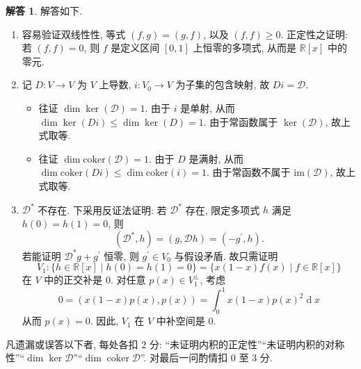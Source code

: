 \documentclass{MainStyle}
\theoremstyle{definition}
\newtheorem{solution}{解答}
\begin{document}
\begin{solution}
    解答如下.
    \begin{enumerate}
        \item 容易验证双线性性, 等式 $(f,g)=(g,f)$, 以及 $(f,f)\geq 0$. 正定性之证明: 若 $(f,f)=0$, 则 $f$ 是定义区间 $[0,1]$ 上恒零的多项式, 从而是 $\mathbb R[x]$ 中的零元.
        \item 记 $D:V\to V$ 为 $V$ 上导数, $i:V_0\to V$ 为子集的包含映射, 故 $Di=\mathscr D$.
              \begin{itemize}
                  \item 往证 $\dim \ker (\mathscr D)=1$. 由于 $i$ 是单射, 从而 $\dim \ker (Di)\leq \dim \ker (D)=1$. 由于常函数属于 $\ker (\mathscr D)$, 故上式取等.
                  \item 往证 $\dim \mathrm{coker} (\mathscr D)=1$. 由于 $D$ 是满射, 从而 $\dim \mathrm{coker}  (Di)\leq \dim \mathrm{coker}  (i)=1$. 由于常函数不属于 $\mathrm{im} (\mathscr D)$, 故上式取等.
              \end{itemize}
        \item $\mathscr D^\ast$ 不存在. 下采用反证法证明: 若 $\mathscr D^\ast$ 存在, 限定多项式 $h$ 满足 $h(0)=h(1)=0$, 则
              \begin{equation*}
                  (\mathscr D^\ast, h)=(g,\mathscr Dh)=(-g^\prime ,h).
              \end{equation*}
              若能证明 $\mathscr D^\ast g +g^\prime$ 恒零, 则 $g^\prime \in V_0$ 与假设矛盾. 故只需证明
              \begin{equation*}
                  V_1:\{h\in \mathbb R[x]\mid h(0)=h(1)=0\}=\{x(1-x)f(x)\mid f\in \mathbb R[x]\}
              \end{equation*}
              在 $V$ 中的正交补是 $0$. 对任意 $p(x)\in V_1^\perp$, 考虑
              \begin{equation*}
                  0=(x(1-x)p(x),p(x))=\int_0^1 x(1-x) p(x)^2\operatorname{d}x
              \end{equation*}
              从而 $p(x)=0$. 因此, $V_1$ 在 $V$ 中补空间是 $0$.
    \end{enumerate}
\end{solution}

\begin{evaluation}
    凡遗漏或误答以下者, 每处各扣 $2$ 分: ``未证明内积的正定性''``未证明内积的对称性''``$\dim \ker\mathscr D$''``$\dim \operatorname{coker}\mathscr D$''. 对最后一问酌情扣 $0$ 至 $3$ 分.
\end{evaluation}
\end{document}
